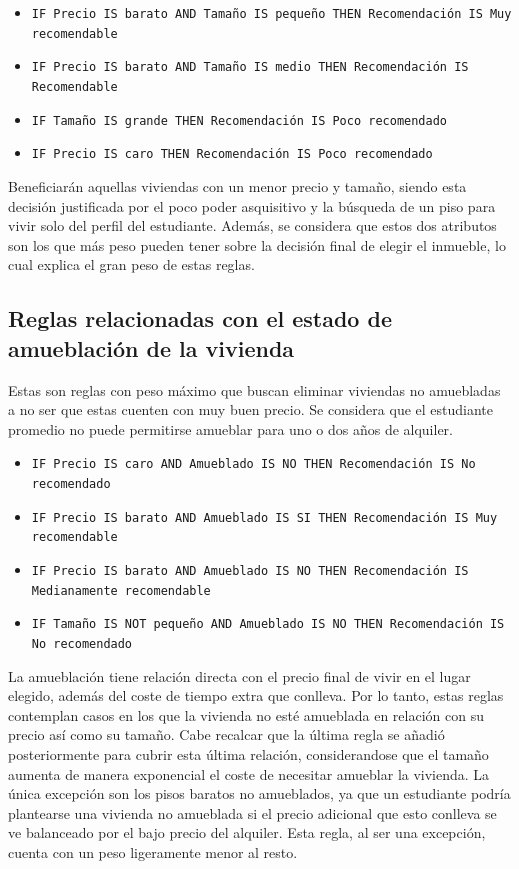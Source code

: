 \documentclass[12pt]{report} %
\begin{document}
    \begin{itemize}
        \item \texttt{IF Precio IS barato AND Tamaño IS pequeño THEN Recomendación IS Muy recomendable}
        \item \texttt{IF Precio IS barato AND Tamaño IS medio THEN Recomendación IS Recomendable}
        \item \texttt{IF Tamaño IS grande THEN Recomendación IS Poco recomendado}
        \item \texttt{IF Precio IS caro THEN Recomendación IS Poco recomendado}
    \end{itemize}

    Beneficiarán aquellas viviendas con un menor precio y tamaño, siendo 
    esta decisión justificada por el poco poder asquisitivo y la búsqueda de un piso para vivir solo
    del perfil del estudiante. Además, se considera que estos dos atributos son los que más peso 
    pueden tener sobre la decisión final de elegir el inmueble, lo cual explica el gran peso de 
    estas reglas.

    \subsection{Reglas relacionadas con el estado de amueblación de la vivienda}
    Estas son reglas con peso máximo que buscan eliminar viviendas no amuebladas a no 
    ser que estas cuenten con muy buen precio. Se considera que el estudiante 
    promedio no puede permitirse amueblar para uno o dos años de alquiler.

    \begin{itemize}
        \item \texttt{IF Precio IS caro AND Amueblado IS NO THEN Recomendación IS No recomendado}
        \item \texttt{IF Precio IS barato AND Amueblado IS SI THEN Recomendación IS Muy recomendable}
        \item \texttt{IF Precio IS barato AND Amueblado IS NO THEN Recomendación IS Medianamente recomendable}
        \item \texttt{IF Tamaño IS NOT pequeño AND Amueblado IS NO THEN Recomendación IS No recomendado}
    \end{itemize}

    La amueblación tiene relación directa con el precio final de vivir en el lugar elegido, 
    además del coste de tiempo extra que conlleva. Por lo tanto, estas reglas contemplan casos en 
    los que la vivienda no esté amueblada en relación con su precio así como su tamaño. Cabe recalcar
    que la última regla se añadió posteriormente para cubrir esta última relación, considerandose que el 
    tamaño aumenta de manera exponencial el coste de necesitar amueblar la vivienda. La única excepción
    son los pisos baratos no amueblados, ya que un estudiante podría plantearse una vivienda no amueblada 
    si el precio adicional que esto conlleva se ve balanceado por el bajo precio del alquiler. Esta regla, 
    al ser una excepción, cuenta con un peso ligeramente menor al resto. 
\end{document}
